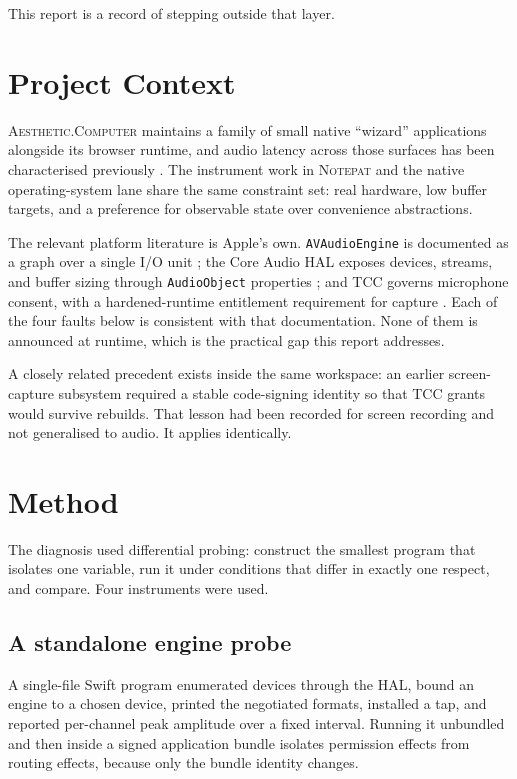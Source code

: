 \documentclass[10pt,letterpaper,twocolumn]{article}
\newcommand{\ac}{\textsc{Aesthetic.Computer}}
\newcommand{\code}[1]{\texttt{#1}}
\begin{document}
This report is a record of stepping outside that layer.

\section{Project Context}

\ac{} maintains a family of small native ``wizard'' applications alongside its browser runtime, and audio latency across those surfaces has been characterised previously \cite{scudderLatency}. The instrument work in \textsc{Notepat} \cite{scudderNotepat} and the native operating-system lane \cite{scudderOS} share the same constraint set: real hardware, low buffer targets, and a preference for observable state over convenience abstractions.

The relevant platform literature is Apple's own. \code{AVAudioEngine} is documented as a graph over a single I/O unit \cite{appleAVAudioEngine}; the Core Audio HAL exposes devices, streams, and buffer sizing through \code{AudioObject} properties \cite{appleCoreAudio}; and TCC governs microphone consent, with a hardened-runtime entitlement requirement for capture \cite{appleHardenedRuntime,appleMicPrivacy}. Each of the four faults below is consistent with that documentation. None of them is announced at runtime, which is the practical gap this report addresses.

A closely related precedent exists inside the same workspace: an earlier screen-capture subsystem required a stable code-signing identity so that TCC grants would survive rebuilds. That lesson had been recorded for screen recording and not generalised to audio. It applies identically.

\section{Method}

The diagnosis used differential probing: construct the smallest program that isolates one variable, run it under conditions that differ in exactly one respect, and compare. Four instruments were used.

\subsection{A standalone engine probe}

A single-file Swift program enumerated devices through the HAL, bound an engine to a chosen device, printed the negotiated formats, installed a tap, and reported per-channel peak amplitude over a fixed interval. Running it unbundled and then inside a signed application bundle isolates permission effects from routing effects, because only the bundle identity changes.
\end{document}
